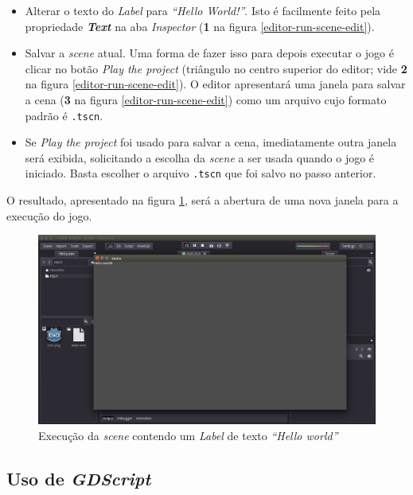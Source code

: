 \begin{itemize}
\item Alterar o texto do \textit{Label} para \textit{``Hello World!''}. Isto é facilmente feito pela propriedade \textbf{\textit{Text}} na aba \textit{Inspector} (\textbf{1} na figura \ref{editor-run-scene-edit}).

\item Salvar a \textit{scene} atual. Uma forma de fazer isso para depois executar o jogo é clicar no botão \textit{Play the project} (triângulo no centro superior do editor; vide \textbf{2} na figura \ref{editor-run-scene-edit}). O editor apresentará uma janela para salvar a cena (\textbf{3} na figura \ref{editor-run-scene-edit}) como um arquivo cujo formato padrão é \texttt{.tscn}.

\item Se \textit{Play the project} foi usado para salvar a cena, imediatamente outra janela será exibida, solicitando a escolha da \textit{scene} a ser usada quando o jogo é iniciado. Basta escolher o arquivo \texttt{.tscn} que foi salvo no passo anterior.
\end{itemize}

O resultado, apresentado na figura \ref{editor-hello-world}, será a abertura de uma nova janela para a execução do jogo.

\begin{figure}[H]
  \centering
  \includegraphics[width=.9\textwidth]{image/editor-hello-world}
  \caption{Execução da \textit{scene} contendo um \textit{Label} de texto \textit{``Hello world''}}
  \label{editor-hello-world}
\end{figure}


\subsection{Uso de \textit{GDScript}}

